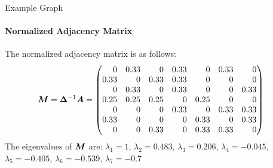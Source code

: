 \begin{frame}{Example Graph}
\framesubtitle{Normalized Adjacency Matrix}
\begin{figure}
    \centerline{
	}
		\vspace{-0.2in}
 \end{figure}
 \small
    The normalized adjacency matrix is as follows:
    \begin{align*}
        \bM & = \bDelta^{-1}\bA =
        \amatr{r}{
        0& 0.33& 0& 0.33& 0& 0.33& 0\\
        0.33& 0& 0.33& 0.33& 0& 0& 0\\
        0& 0.33& 0& 0.33& 0& 0& 0.33\\
        0.25& 0.25& 0.25& 0& 0.25& 0& 0\\
        0& 0& 0& 0.33& 0& 0.33& 0.33\\
        0.33& 0& 0& 0& 0.33& 0& 0.33\\
        0& 0& 0.33& 0& 0.33& 0.33& 0\\
        }
    \end{align*}
    The eigenvalues of ${\boldsymbol M}$ are:
    $\lambda_1   = 1 $,
    $\lambda_2  =0.483 $,
    $\lambda_3  =0.206$,
    $\lambda_4  = -0.045$,
    $\lambda_5  =-0.405 $,
    $\lambda_6  = -0.539 $,
    $\lambda_7 =-0.7$
  \end{frame}



